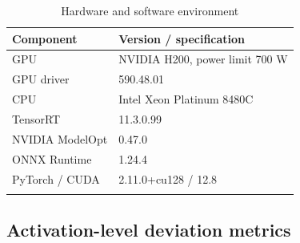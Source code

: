 \documentclass[pdflatex,sn-mathphys-num]{sn-jnl}%
\theoremstyle{thmstyleone}%
\theoremstyle{thmstyletwo}%
\theoremstyle{thmstylethree}%
\begin{document}
\begin{table}[htbp]
\caption{Hardware and software environment}\label{tab:hardware}
\begin{tabular}{@{}ll@{}}
\toprule
Component & Version / specification \\
\midrule
GPU & NVIDIA H200, power limit 700 W \\
GPU driver & 590.48.01 \\
CPU & Intel Xeon Platinum 8480C \\
TensorRT & 11.3.0.99 \\
NVIDIA ModelOpt & 0.47.0 \\
ONNX Runtime & 1.24.4 \\
PyTorch / CUDA & 2.11.0+cu128 / 12.8 \\
\botrule
\end{tabular}
\end{table}

\subsection{Activation-level deviation metrics}\label{sec:metrics}
\end{document}
